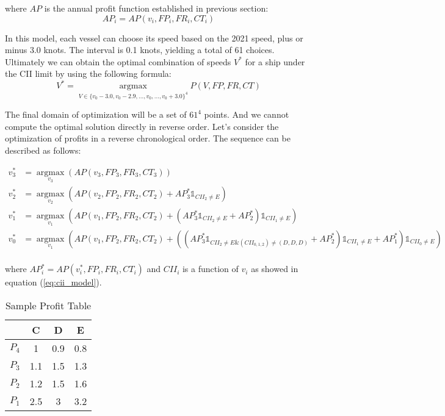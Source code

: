 \documentclass[a4paper,12pt]{article}
\begin{document}
where $AP$ is the annual profit function established in previous section:
\begin{equation}
	AP_i = AP(v_i, FP_i, FR_i, CT_i)
\end{equation}

In this model, each vessel can choose its speed based on the 2021 speed, plus or minus 3.0 knots.
The interval is 0.1 knots, yielding a total of 61 choices.
Ultimately we can obtain the optimal combination of speeds $V^\ast$ for a ship under the CII limit by using the following formula:
\begin{equation}
	\label{eq:vast}
	V^\ast = \operatorname*{argmax}_{V\in \{v_0-3.0, v_0-2.9, ..., v_0,...,v_0+3.0 \}^4} P(V, FP, FR, CT)
\end{equation}


The final domain of optimization will be a set of $61^4$ points. 
And we cannot compute the optimal solution directly in reverse order.
Let's consider the optimization of profits in a reverse chronological order. 
The sequence can be described as follows:

\begin{align*}
v_3^\ast &= \operatorname*{argmax}_{v_3} (AP(v_3, FP_3, FR_3, CT_3))\\
v_2^\ast &= \operatorname*{argmax}_{v_2}  (AP(v_2, FP_2, FR_2, CT_2)+AP_3^\ast \mathds{1} _{CII_2 \neq E} ) \\
v_1^\ast &= \operatorname*{argmax}_{v_1}  (AP(v_1, FP_2, FR_2, CT_2)+(AP_3^\ast \mathds{1} _{CII_2 \neq E}+ AP_2^\ast )\mathds{1} _{CII_1 \neq E} ) \\
v_0^\ast &= \operatorname*{argmax}_{v_1}  (AP(v_1, FP_2, FR_2, CT_2)+((AP_3^\ast \mathds{1} _{CII_2 \neq E \& (CII_{0,1,2}) \neq (D,D,D)}+ AP_2^\ast)\mathds{1} _{CII_1 \neq E} +AP_1^\ast )\mathds{1} _{CII_0 \neq E}) \\
\end{align*}

where $AP_i^\ast = AP(v_i^\ast, FP_i, FR_i, CT_i)$ and $CII_i$ is a function of $v_i$ as showed in equation (\ref{eq:cii_model}).\\

\begin{table}[h!]
\centering
\begin{tabular}{|c|c|c|c|}
	\hline
	& C & D & E \\
	\hline
	$P_4$ & 1 & 0.9 & 0.8 \\
	\hline
	$P_3$ & 1.1 & 1.5 & 1.3 \\
	\hline
	$P_2$ & 1.2 & 1.5 & 1.6 \\
	\hline
	$P_1$ & 2.5 & 3 & 3.2 \\
	\hline
\end{tabular}
\caption{Sample Profit Table}
\label{tb:sample_profit}
\end{table}
\end{document}
